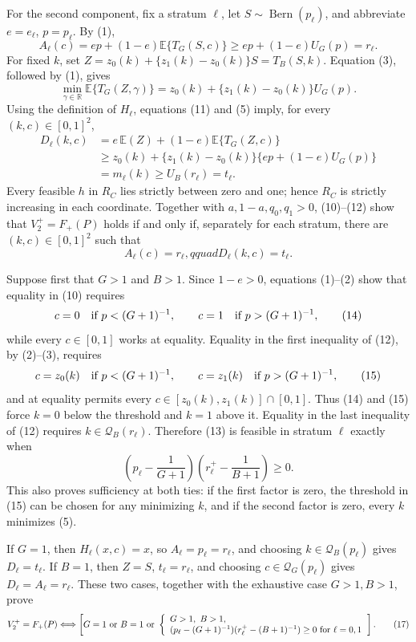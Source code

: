 For the second component, fix a stratum \(\ell\), let
\(S\sim\operatorname{Bern}(p_\ell)\), and abbreviate
\(e=e_\ell\), \(p=p_\ell\).  By (1),
\[
 A_\ell(c)=ep+(1-e)\mathbb E\{T_G(S,c)\}
 \geq ep+(1-e)U_G(p)=r_\ell.                                  \tag{10}
\]
For fixed \(k\), set \(Z=z_0(k)+\{z_1(k)-z_0(k)\}S=T_B(S,k)\).
Equation (3), followed by (1), gives
\[
 \min_{\gamma\in\mathbb R}\mathbb E\{T_G(Z,\gamma)\}
 =z_0(k)+\{z_1(k)-z_0(k)\}U_G(p).                              \tag{11}
\]
Using the definition of \(H_\ell\), equations (11) and (5) imply,
for every \((k,c)\in[0,1]^2\),
\[
 \begin{aligned}
 D_\ell(k,c)
 &=e\,\mathbb E(Z)+(1-e)\mathbb E\{T_G(Z,c)\}\\
 &\geq z_0(k)+\{z_1(k)-z_0(k)\}
        \{ep+(1-e)U_G(p)\}\\
 &=m_\ell(k)\geq U_B(r_\ell)=t_\ell.                         \tag{12}
 \end{aligned}
\]
Every feasible \(h\) in \(R_C\) lies strictly between zero and one;
hence \(R_C\) is strictly increasing in each coordinate.  Together
with \(a,1-a,q_0,q_1>0\), (10)--(12) show that
\(V_2^+=F_+(P)\) holds if and only if, separately for each stratum,
there are \((k,c)\in[0,1]^2\) such that
\[
 A_\ell(c)=r_\ell,qquad D_\ell(k,c)=t_\ell.                   \tag{13}
\]

Suppose first that \(G>1\) and \(B>1\).  Since \(1-e>0\), equations
(1)--(2) show that equality in (10) requires
\[
 c=0\quad\hbox{if }p<(G+1)^{-1},\qquad
 c=1\quad\hbox{if }p>(G+1)^{-1},                              \tag{14}
\]
while every \(c\in[0,1]\) works at equality.  Equality in the first
inequality of (12), by (2)--(3), requires
\[
 c=z_0(k)\quad\hbox{if }p<(G+1)^{-1},\qquad
 c=z_1(k)\quad\hbox{if }p>(G+1)^{-1},                          \tag{15}
\]
and at equality permits every \(c\in[z_0(k),z_1(k)]\cap[0,1]\).
Thus (14) and (15) force \(k=0\) below the threshold and \(k=1\)
above it.  Equality in the last inequality of (12) requires
\(k\in\mathcal Q_B(r_\ell)\).  Therefore (13) is feasible in stratum
\(\ell\) exactly when
\[
 \left(p_\ell-\frac1{G+1}\right)
 \left(r_\ell^+-\frac1{B+1}\right)\geq0.                     \tag{16}
\]
This also proves sufficiency at both ties: if the first factor is zero,
the threshold in (15) can be chosen for any minimizing \(k\), and if
the second factor is zero, every \(k\) minimizes (5).

If \(G=1\), then \(H_\ell(x,c)=x\), so
\(A_\ell=p_\ell=r_\ell\), and choosing
\(k\in\mathcal Q_B(p_\ell)\) gives \(D_\ell=t_\ell\).  If \(B=1\),
then \(Z=S\), \(t_\ell=r_\ell\), and choosing
\(c\in\mathcal Q_G(p_\ell)\) gives
\(D_\ell=A_\ell=r_\ell\).  These two cases, together with the
exhaustive case \(G>1,B>1\), prove
\[
 V_2^+=F_+(P)
 \Longleftrightarrow
 \left[
 G=1\ \hbox{or}\ B=1\ \hbox{or}\
 \left\{
 \begin{array}{l}
 G>1,\ B>1,\\
 (p_\ell-(G+1)^{-1})(r_\ell^+-(B+1)^{-1})\geq0
 \text{ for }\ell=0,1
 \end{array}
 \right.
 \right].                                                     \tag{17}
\]

